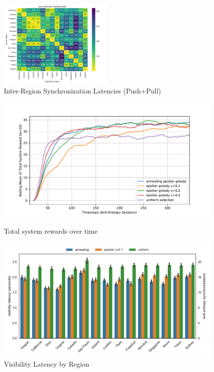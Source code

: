 \begin{figure}[hb]
    \centering
    \includegraphics[width=0.5\textwidth]{figures/latency_sync_heatmap}
    \caption{Inter-Region Synchronization Latencies (Push+Pull)}
    \label{fig:latency_sync_heatmap}
\end{figure}

\begin{figure}[t!]
    \centering
      \includegraphics[width=\linewidth]{figures/rewards}
      \caption{Total system rewards over time}
      \label{fig:system_rewards}
    \endminipage\hfill
      \includegraphics[width=\linewidth]{figures/visibility_latency}
      \caption{Visibility Latency by Region}
      \label{fig:visibility_latency}
    \endminipage
\end{figure}

